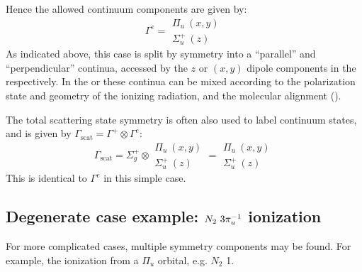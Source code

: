 \documentclass[letterpaper,table,10pt,english]{jupyterBook}
\begin{document}
\sphinxAtStartPar
Hence the allowed continuum components are given by:
\label{equation:part2/sym-fitting-intro_220423:dec6dcff-cbbb-4e2f-8d09-7b71a416368f}\begin{equation}
\Gamma^{e}=\begin{array}{c}
\Pi_{u}~(x,y)\\
\Sigma_{u}^{+}~(z)
\end{array}
\end{equation}
\sphinxAtStartPar
As indicated above, this case is split by symmetry into a “parallel” and “perpendicular” continua, accessed by the \(z\) or \((x,y)\) dipole components in the {\hyperref[\detokenize{backmatter/glossary:term-MF}]{}} respectively. In the {\hyperref[\detokenize{backmatter/glossary:term-LF}]{}} or {\hyperref[\detokenize{backmatter/glossary:term-AF}]{}} these continua can be mixed according to the polarization state and geometry of the ionizing radiation, and the molecular alignment ({\hyperref[\detokenize{backmatter/glossary:term-ADMs}]{}}).

\sphinxAtStartPar
The total scattering state symmetry is often also used to label continuum states, and is given by \(\Gamma_{\mathrm{scat}}=\Gamma^{+}\otimes\Gamma^{e}\):
\label{equation:part2/sym-fitting-intro_220423:c216b823-c5d5-477b-b049-610b4e834d27}\begin{equation}
\Gamma_{\mathrm{scat}}=\Sigma_{g}^{+}\otimes\begin{array}{c}
\Pi_{u}~(x,y)\\
\Sigma_{u}^{+}~(z)
\end{array}=\begin{array}{c}
\Pi_{u}~(x,y)\\
\Sigma_{u}^{+}~(z)
\end{array}
\end{equation}
\sphinxAtStartPar
This is identical to \(\Gamma^{e}\) in this simple case.


\subsection{Degenerate case example: \protect\(N_2~3\pi_u^{-1}\protect\) ionization}
\label{\detokenize{part2/sym-fitting-intro_220423:degenerate-case-example-n-2-3-pi-u-1-ionization}}
\sphinxAtStartPar
For more complicated cases, multiple symmetry components may be found. For example, the ionization from a \(\Pi_u\) orbital, e.g. \(N_2\) {\hyperref[\detokenize{backmatter/glossary:term-HOMO}]{}}\sphinxhyphen{}1.
\end{document}
